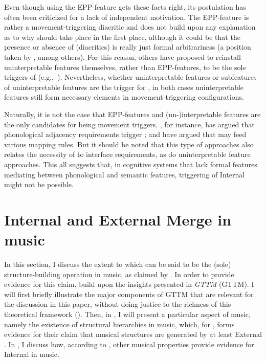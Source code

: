 \documentclass[output=paper]{langsci/langscibook}
\begin{document}
Even though using the \gls{EPP}-feature gets
these facts right, its postulation has often been criticized for a lack of
independent motivation. The \gls{EPP}-feature is rather a movement-triggering diacritic and does not build upon any
explanation as to why  should take place in the first place,
although it could be that the presence or absence of 
(diacritics) is really just formal arbitrariness (a position taken by
\citealt{BibHolRob2009,BibHolRobShee2014,BibRob2015}, among others).  For this
reason, others have proposed to reinstall uninterpretable features themselves,
rather than \gls{EPP}-features, to be the
sole triggers of  (e.g.,~\citealt{BjoZei2019}). Nevertheless,
whether uninterpretable features or subfeatures of uninterpretable features are
the trigger for , in both cases uninterpretable features still
form necessary elements in movement-triggering configurations.

Naturally, it is not the case that \gls{EPP}-features and (un-)interpretable features are the only candidates for being
movement triggers. \citet{Richards2016}, for instance, has argued that
phonological adjacency requirements trigger ; and \citet{NeeKoo2008}
have argued that  may feed various mapping rules. But it should be
noted that this type of approaches also relates the necessity of  to
interface requirements, as do uninterpretable feature approaches. This all
suggests that, in cognitive systems that lack formal features mediating between
phonological and semantic features, triggering of Internal  might
not be possible.

\section{Internal and External Merge in music}\label{sec:26.3}

In this section, I discuss the extent to which  can be said to be
the (sole) structure-building operation in music, as claimed by
\citeauthor{KatzPes2011}.  In order to provide evidence for this claim,
\citeauthor{KatzPes2011} build upon the insights presented in
 \emph{\glsdesc{GTTM}} (\gls{GTTM}). I will
first briefly illustrate the major components of \gls{GTTM} that are relevant for the discussion in this paper,
without doing justice to the richness of this theoretical framework
(). Then, in , I will present a
particular aspect of music, namely the existence of structural hierarchies in
music, which, for \citeauthor{KatzPes2011}, forms evidence for their claim that
musical structures are generated by at least External .  In
, I discuss how, according to \citeauthor{KatzPes2011},
other musical properties provide evidence for Internal  in music.
\end{document}
